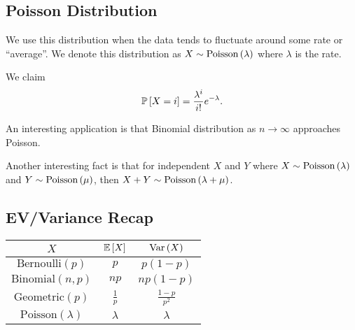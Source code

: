 \subsection{Poisson Distribution}
We use this distribution when the data tends to fluctuate around some rate or ``average''. We denote this distribution as $X \sim \text{Poisson}\left( \lambda \right)$ where $\lambda$ is the rate. 

We claim \[ \mathbb{P}\left[ X = i \right] = \dfrac{{\lambda}^{i}}{i !} e^{- {\lambda}}. \]

An interesting application is that Binomial distribution as $n \to \infty$ approaches Poisson.

Another interesting fact is that for independent $X$ and $Y$ where $X \sim \text{Poisson}\left( \lambda \right)$ and $Y \sim \text{Poisson}\left( \mu \right)$, then $X+Y \sim \text{Poisson}\left( \lambda + \mu \right)$.  

\subsection{EV/Variance Recap}

\begin{center}
    \begin{tabular}{|c|c|c|}
        \hline 
        $X$ & $\mathbb{E}\left[ X \right]$ & $\text{Var}\left( X \right)$ \\
        \hline
        $\text{Bernoulli}(p)$ & $p$ & $p(1-p)$ \\
        \hline
        $\text{Binomial}(n,p)$ & $np$ & $np(1-p)$ \\
        \hline
        $\text{Geometric}(p)$ & $\frac{1}{p}$ & $\frac{1-p}{p^2}$ \\
        \hline
        $\text{Poisson}(\lambda)$ & $\lambda$ & $\lambda$ \\
        \hline
    \end{tabular}
\end{center}